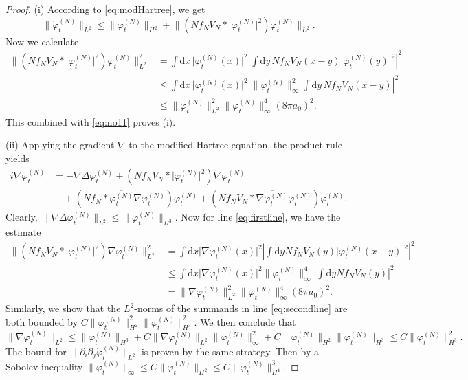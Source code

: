 \documentclass[11pt,a4paper,draft,DIV11]{scrartcl}	%
\newcommand{\di}{\textrm{d}}		%
\newcommand{\cc}[1]{\overline{#1}}	%
\newcommand{\norm}[1]{\lVert#1\rVert}	%
\newcommand{\ph}{\varphi_t^{(N)}}	%
\newcommand{\phdot}{\dot{\varphi}_t^{(N)}}	%
\newcommand{\be}[1]{\begin{equation}\label{eq:#1}}	%
\newcommand{\ee}{\end{equation}}
\newcommand{\eqr}[1]{\eqref{eq:#1}}			%
\begin{document}
\begin{proof}(i) According to \eqr{modHartree}, we get
\be{no11}
\norm{\phdot}_{L^2} \leq \norm{\ph}_{H^2} + \norm{\left(N f_N V_N \ast \lvert \ph\rvert^2 \right)\ph}_{L^2}.
\ee
Now we calculate
\begin{align*}
\norm{\left(N f_N V_N \ast \lvert \ph\rvert^2 \right)\ph}_{L^2}^2 & = \int \di x\, \lvert \ph(x)\rvert^2 \left\lvert \int \di y\, N f_NV_N(x-y) \lvert \ph(y)\rvert^2 \right\rvert^2 \\
& \leq \int \di x\, \lvert \ph(x)\rvert^2 \left\lvert \norm{\ph}_\infty^2 \int \di y\, N f_N V_N(x-y) \right\rvert^2 \\
& \leq \norm{\ph}_{L^2}^2 \norm{\ph}_\infty^4 (8\pi a_0)^2.
\end{align*}
This combined with \eqr{no11} proves (i).

(ii)
Applying the gradient $\nabla$ to the modified Hartree equation, the product rule yields
\begin{align}
i \nabla \phdot & = - \nabla \Delta \ph + \left( N f_N V_N \ast \lvert \ph \rvert^2 \right) \nabla \ph \label{eq:firstline}\\
& \quad + \left( N f_N \ast \cc{\ph} \nabla \ph \right) \ph + \left( N f_N V_N \ast \cc{\nabla \ph} \ph \right) \ph. \label{eq:secondline}
\end{align}
Clearly, $\norm{\nabla \Delta \ph}_{L^2} \leq \norm{\ph}_{H^3}$. Now for line \eqref{eq:firstline}, we have the estimate
\begin{align*}
\norm{\left( N f_N V_N \ast \lvert \ph \rvert^2 \right)\nabla \ph}_{L^2}^2 & = \int \di x \lvert \nabla \ph(x)\rvert^2 \left\lvert \int \di y N f_N V_N(y) \lvert\ph(x-y) \rvert^2\right\rvert^2\\
& \leq \int \di x \lvert \nabla \ph(x)\rvert^2 \norm{\ph}_\infty^4 \left\lvert \int \di y N f_N V_N(y) \right\rvert^2 \\
& = \norm{\nabla \ph}_{L^2}^2 \norm{\ph}_\infty^4 (8 \pi a_0)^2. 
\end{align*}
Similarly, we show that the $L^2$-norms of the summands in line \eqref{eq:secondline} are both bounded by $C \norm{\ph}_{H^2}^2 \norm{\ph}_{H^3}^2$. We then conclude that
\[
\norm{\nabla \phdot}_{L^2} \leq \norm{\ph}_{H^3} + C \norm{\nabla \ph}_{L^2} \norm{\ph}_\infty^2 + C \norm{\ph}_{H^2} \norm{\ph}_{H^3} \leq C \norm{\ph}_{H^3}^2.
\]
The bound for $\norm{\partial_i \partial_j \phdot}_{L^2}$ is proven by the same strategy.
Then by a Sobolev inequality $\norm{\phdot}_\infty \leq C \norm{\phdot}_{H^2} \leq C \norm{\ph}_{H^4}^3$.


\end{proof}
\end{document}
